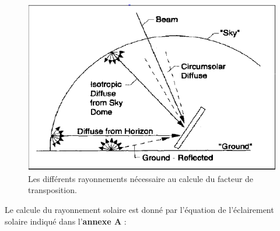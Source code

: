 \documentclass[12pt,a4paper,openright]{report}
\begin{document}
\begin{figure}[h!]
  \begin{center}
    \includegraphics[scale=0.5]{diffrayonn}
    \caption{Les différents rayonnements nécessaire au calcule du facteur de transposition.}
  \end{center}
\end{figure}
\newpage
\noindent Le calcule du rayonnement solaire est donné par l'équation de l'éclairement solaire indiqué dans l'\textbf{annexe A} :
\end{document}
